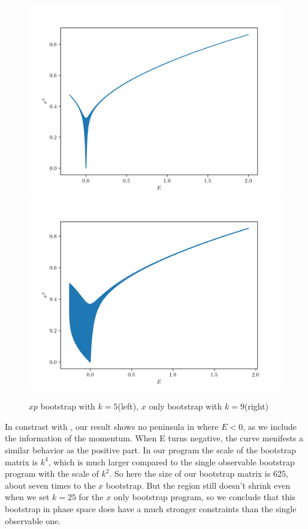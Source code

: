 \documentclass[aps, preprint,amsmath, amssymb]{revtex4-2}
\begin{document}
\begin{figure}
    \includegraphics[width=0.45\linewidth]{plot_5.png}
    \includegraphics[width=0.45\linewidth]{x_9.png}
    \caption{$xp$ bootstrap with $k = 5$(left), $x$ only bootstrap with $k = 9$(right)}
    \label{fig:doublewell}
\end{figure}

% 

In constrast with \cite{Nakayama_2022}, our result shows no peninsula in where $E < 0$, as we include the information of the momentum. When E turns negative, the curve menifests a similar behavior as the positive part. In our program the scale of the bootstrap matrix is $k^4$, which is much larger compared to the single observable bootstrap program with the scale of $k^2$. So here the size of our bootstrap matrix is $625$, about seven times to the $x$ bootstrap. But the region still doesn't shrink even when we set $k = 25$ for the $x$ only bootstrap program, so we conclude that this bootstrap in phase space does have a much stronger constraints than the single observable one.

\end{document}
